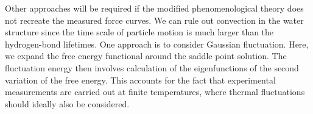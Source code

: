 Other approaches will be required if the modified phenomenological
theory does not recreate the measured force curves. We can rule out
convection in the water structure since the time scale of particle
motion is much larger than the hydrogen-bond lifetimes. One approach is
to consider Gaussian fluctuation. Here, we expand the free energy
functional around the saddle point solution. The fluctuation energy
then involves calculation of the eigenfunctions of the second variation
of the free energy. This accounts for the fact that experimental
measurements are carried out at finite temperatures, where thermal
fluctuations should ideally also be considered. 

%
%
%

